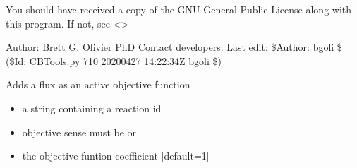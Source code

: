 \documentclass[letterpaper,10pt,english]{sphinxmanual}
\begin{document}
\sphinxAtStartPar
You should have received a copy of the GNU General Public License
along with this program.  If not, see \textless{}\textgreater{}

\sphinxAtStartPar
Author: Brett G. Olivier PhD
Contact developers: 
Last edit: \$Author: bgoli \$ (\$Id: CBTools.py 710 2020\sphinxhyphen{}04\sphinxhyphen{}27 14:22:34Z bgoli \$)

\begin{fulllineitems}
\label{\detokenize{modules_doc:cbmpy.CBTools.addFluxAsActiveObjective}}
\pysigstartsignatures
{}
\pysigstopsignatures
\sphinxAtStartPar
Adds a flux as an active objective function
\begin{itemize}
\item {} 
\sphinxAtStartPar
{} a string containing a reaction id

\item {} 
\sphinxAtStartPar
{} objective sense must be  or 

\item {} 
\sphinxAtStartPar
{} the objective funtion coefficient {[}default=1{]}

\end{itemize}

\end{fulllineitems}

\end{document}

